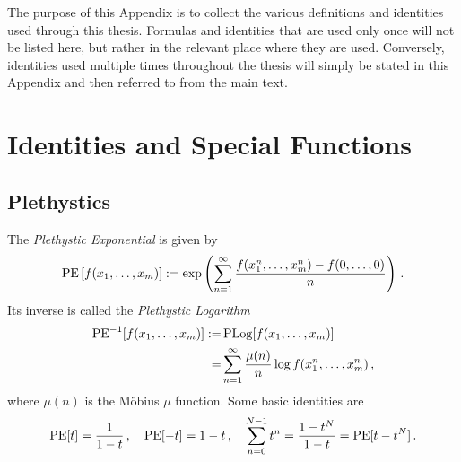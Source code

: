 \documentclass[main.tex]{subfiles}
\begin{document}
The purpose of this Appendix is to collect the various definitions and identities used through this thesis. Formulas and identities that are used only once will not be listed here, but rather in the relevant place where they are used. Conversely, identities used multiple times throughout the thesis will simply be stated in this Appendix and then referred to from the main text.

\section{Identities and Special Functions}
\subsection{Plethystics}
The \textit{Plethystic Exponential} is given by
\begin{equation}\label{eqn:PE}
\operatorname{\mathrm{PE}}\left[f(x_1,\dots,x_m)\right]:=\exp\left(\sum_{n=1}^{\infty}\frac{f(x_1^n,\dots,x_m^n)-f(0,\dots,0)}{n}\right)\,.
\end{equation}
Its inverse is called the \textit{Plethystic Logarithm}
\begin{equation}\label{eqn:PLog}
\begin{aligned}
\operatorname{\mathrm{PE}}^{-1}[f(x_1,\dots,x_m)]:=&\operatorname{\mathrm{PLog}}[f(x_1,\dots,x_m)]\\
=&\sum_{n=1}^{\infty}\frac{\mu(n)}{n}\log f(x_1^n,\dots,x_m^n)\,,
\end{aligned}
\end{equation}
where $\mu(n)$ is the M\"obius $\mu$ function. 
Some basic identities are
\begin{equation}
\operatorname{\mathrm{PE}}[t]=\frac{1}{1-t}\,,\quad \operatorname{\mathrm{PE}}[-t]=1-t\,,\quad \sum_{n=0}^{N-1}t^n=\frac{1-t^N}{1-t}=\operatorname{\mathrm{PE}}[t-t^N]\,.
\end{equation}
\end{document}
